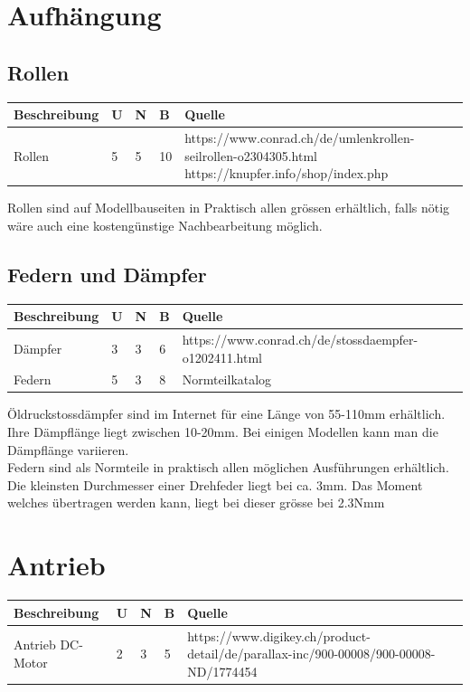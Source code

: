 \documentclass[a4paper]{report}
\begin{document}
\section{Aufhängung}
	\subsection{Rollen}
	\begin{tabular}{|p{}|p{}|p{}|p{}|p{}|}
		\hline
		\textbf{Beschreibung} & \textbf{U} & \textbf{N} & \textbf{B} & \textbf{Quelle} \\
		\hline
		Rollen &5 &5 &10 & https://www.conrad.ch/de/umlenkrollen-seilrollen-o2304305.html
		\newline https://knupfer.info/shop/index.php \\
		\hline
	\end{tabular}


		Rollen sind auf Modellbauseiten in Praktisch allen grössen erhältlich, falls nötig wäre auch eine kostengünstige Nachbearbeitung möglich.
	\subsection{Federn und Dämpfer}
		\begin{tabular}{|p{}|p{}|p{}|p{}|p{}|}
		\hline
		\textbf{Beschreibung} & \textbf{U} & \textbf{N} & \textbf{B} & \textbf{Quelle} \\
		\hline
		Dämpfer &3 &3 &6 & https://www.conrad.ch/de/stossdaempfer-o1202411.html \\
		\hline
		Federn &5 &3 &8 & Normteilkatalog\\
		\hline
	\end{tabular}


		Öldruckstossdämpfer sind im Internet für eine Länge von 55-110mm erhältlich. Ihre Dämpflänge liegt zwischen 10-20mm. Bei einigen Modellen kann man die Dämpflänge variieren. \\
		Federn sind als Normteile in praktisch allen möglichen Ausführungen erhältlich. Die kleinsten Durchmesser einer Drehfeder liegt bei ca. 3mm. Das Moment welches übertragen werden kann, liegt bei dieser grösse bei 2.3Nmm

\section{Antrieb}
\begin{tabular}{|p{}|p{}|p{}|p{}|p{}|}
	\hline
	\textbf{Beschreibung} & \textbf{U} & \textbf{N} & \textbf{B} & \textbf{Quelle} \\
	\hline
	Antrieb DC-Motor & 2 & 3 & 5 & https://www.digikey.ch/product-detail/de/parallax-inc/900-00008/900-00008-ND/1774454 \\
	\hline
\end{tabular}
\end{document}
